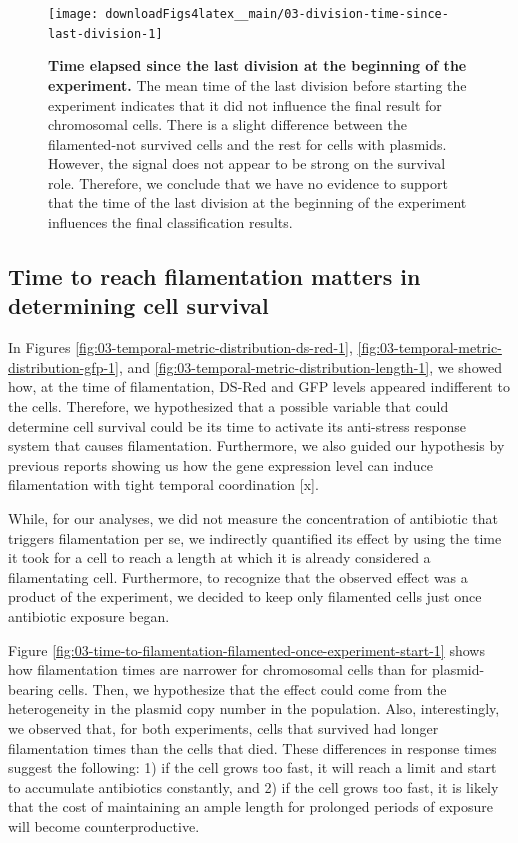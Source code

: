 \documentclass[a4paper, nobind]{templates/ociamthesis}
\begin{document}
\begin{figure}[H]
\texttt{[image: downloadFigs4latex\_\_main/03-division-time-since-last-division-1]} \caption[Time elapsed since the last division at the beginning of the experiment.]{\textbf{Time elapsed since the last division at the beginning of the experiment.} The mean time of the last division before starting the experiment indicates that it did not influence the final result for chromosomal cells. There is a slight difference between the filamented-not survived cells and the rest for cells with plasmids. However, the signal does not appear to be strong on the survival role. Therefore, we conclude that we have no evidence to support that the time of the last division at the beginning of the experiment influences the final classification results.}\label{fig:03-division-time-since-last-division-1}
\end{figure}

\hypertarget{time-to-reach-filamentation-matters-in-determining-cell-survival}{%
\subsection{Time to reach filamentation matters in determining cell survival}\label{time-to-reach-filamentation-matters-in-determining-cell-survival}}

In Figures \ref{fig:03-temporal-metric-distribution-ds-red-1}, \ref{fig:03-temporal-metric-distribution-gfp-1}, and \ref{fig:03-temporal-metric-distribution-length-1}, we showed how, at the time of filamentation, DS-Red and GFP levels appeared indifferent to the cells.
Therefore, we hypothesized that a possible variable that could determine cell survival could be its time to activate its anti-stress response system that causes filamentation.
Furthermore, we also guided our hypothesis by previous reports showing us how the gene expression level can induce filamentation with tight temporal coordination {[}x{]}.

While, for our analyses, we did not measure the concentration of antibiotic that triggers filamentation per se, we indirectly quantified its effect by using the time it took for a cell to reach a length at which it is already considered a filamentating cell.
Furthermore, to recognize that the observed effect was a product of the experiment, we decided to keep only filamented cells just once antibiotic exposure began.

Figure \ref{fig:03-time-to-filamentation-filamented-once-experiment-start-1} shows how filamentation times are narrower for chromosomal cells than for plasmid-bearing cells.
Then, we hypothesize that the effect could come from the heterogeneity in the plasmid copy number in the population.
Also, interestingly, we observed that, for both experiments, cells that survived had longer filamentation times than the cells that died.
These differences in response times suggest the following: 1) if the cell grows too fast, it will reach a limit and start to accumulate antibiotics constantly, and 2) if the cell grows too fast, it is likely that the cost of maintaining an ample length for prolonged periods of exposure will become counterproductive.
\end{document}
